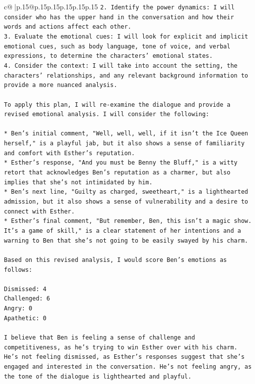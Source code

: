 \documentclass{article}
\begin{document}
{\begin{supertabular}{c@{$\;$}|p{.15\linewidth}@{}p{.15\linewidth}p{.15\linewidth}p{.15\linewidth}p{.15\linewidth}p{.15\linewidth}}
{{{\texttt{2. Identify the power dynamics: I will consider who has the upper hand in the conversation and how their words and actions affect each other.} \\
\texttt{3. Evaluate the emotional cues: I will look for explicit and implicit emotional cues, such as body language, tone of voice, and verbal expressions, to determine the characters' emotional states.} \\
\texttt{4. Consider the context: I will take into account the setting, the characters' relationships, and any relevant background information to provide a more nuanced analysis.} \\
\\ 
\texttt{To apply this plan, I will re{-}examine the dialogue and provide a revised emotional analysis. I will consider the following:} \\
\\ 
\texttt{* Ben's initial comment, "Well, well, well, if it isn't the Ice Queen herself," is a playful jab, but it also shows a sense of familiarity and comfort with Esther's reputation.} \\
\texttt{* Esther's response, "And you must be Benny the Bluff," is a witty retort that acknowledges Ben's reputation as a charmer, but also implies that she's not intimidated by him.} \\
\texttt{* Ben's next line, "Guilty as charged, sweetheart," is a lighthearted admission, but it also shows a sense of vulnerability and a desire to connect with Esther.} \\
\texttt{* Esther's final comment, "But remember, Ben, this isn't a magic show. It's a game of skill," is a clear statement of her intentions and a warning to Ben that she's not going to be easily swayed by his charm.} \\
\\ 
\texttt{Based on this revised analysis, I would score Ben's emotions as follows:} \\
\\ 
\texttt{Dismissed: 4} \\
\texttt{Challenged: 6} \\
\texttt{Angry: 0} \\
\texttt{Apathetic: 0} \\
\\ 
\texttt{I believe that Ben is feeling a sense of challenge and competitiveness, as he's trying to win Esther over with his charm. He's not feeling dismissed, as Esther's responses suggest that she's engaged and interested in the conversation. He's not feeling angry, as the tone of the dialogue is lighthearted and playful.} \\
}}}
\end{supertabular}}
\end{document}
